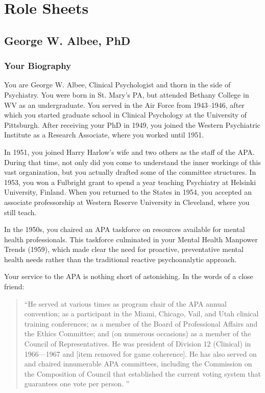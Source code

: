 \renewcommand*{\thechapter}{\arabic{chapter}}
\setcounter{chapter}{0}
\mainmatter

\part{Role Sheets}
\label{rolesheets}

\begin{refsection}

\chapter{George W. Albee, PhD}
\label{georgew.albeephd}

\section{Your Biography}
\label{yourbiography}

You are George W. Albee, Clinical Psychologist and thorn in the side of Psychiatry. You were born in St. Mary's PA, but attended Bethany College in WV as an undergraduate. You served in the Air Force from 1943--1946, after which you started graduate school in Clinical Psychology at the University of Pittsburgh. After receiving your PhD in 1949, you joined the Western Psychiatric Institute as a Research Associate, where you worked until 1951.

In 1951, you joined Harry Harlow's wife and two others as the staff of the APA. During that time, not only did you come to understand the inner workings of this vast organization, but you actually drafted some of the committee structures. In 1953, you won a Fulbright grant to spend a year teaching Psychiatry at Helsinki University, Finland. When you returned to the States in 1954, you accepted an associate professorship at Western Reserve University in Cleveland, where you still teach.

In the 1950s, you chaired an APA taskforce on resources available for mental health professionals. This taskforce culminated in your Mental Health Manpower Trends (1959), which made clear the need for proactive, preventative mental health needs rather than the traditional reactive psychoanalytic approach.

Your service to the APA is nothing short of astonishing. In the words of a close friend:

\begin{quote}

``He served at various times as program chair of the APA annual convention; as a participant in the Miami, Chicago, Vail, and Utah clinical training conferences; as a member of the Board of Professional Affairs and the Ethics Committee; and (on numerous occasions) as a member of the Council of Representatives. He was president of Division 12 (Clinical) in 1966---1967 and [item removed for game coherence]. He has also served on and chaired innumerable APA committees, including the Commission on the Composition of Council that established the current voting system that guarantees one vote per person. ''
\end{quote}


\end{refsection}
